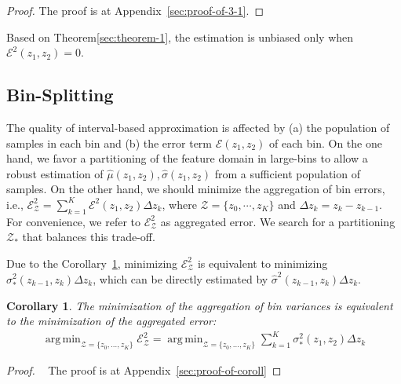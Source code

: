 \documentclass[twoside]{article}
\DeclareMathOperator*{\argmin}{arg\,min}
\newtheorem{corollary}{Corollary}[theorem]
\begin{document}
\begin{proof}
The proof is at Appendix~\ref{sec:proof-of-3-1}.
\end{proof}

\noindent

Based on Theorem\ref{sec:theorem-1}, the estimation is unbiased only
when \(\mathcal{E}^2(z_1, z_2) = 0\).

\subsection{Bin-Splitting}
\label{sec:bin-spliting}

The quality of interval-based approximation is affected by (a) the
population of samples in each bin and (b) the error term
\(\mathcal{E}(z_1, z_2)\) of each bin. On the one hand, we favor a
partitioning of the feature domain in large-bins to allow a robust
estimation of \(\hat{\mu}(z_1, z_2), \hat{\sigma}(z_1, z_2)\) from a
sufficient population of samples. On the other hand, we should
minimize the aggregation of bin errors, i.e.,
\( \mathcal{E}^2_{\mathcal{Z}} = \sum_{k=1}^K\mathcal{E}^2(z_1, z_2)
\Delta z_k\), where \(\mathcal{Z} = \{z_0, \cdots, z_K\}\) and
\(\Delta z_k = z_k - z_{k-1}\). For convenience, we refer to
\(\mathcal{E}^2_{\mathcal{Z}}\) as aggregated error. We search for a
partitioning \(\mathcal{Z}_*\) that balances this trade-off.

Due to the Corollary~\ref{sec:coroll}, minimizing
\( \mathcal{E}^2_{\mathcal{Z}} \) is equivalent to minimizing
\(\sigma_*^2(z_{k-1}, z_k)\Delta z_k\), which can be directly
estimated by \(\hat{\sigma}^2(z_{k-1}, z_k) \Delta z_k \).

\begin{corollary}
  \label{sec:coroll}
  The minimization of the aggregation of bin variances is equivalent
  to the minimization of the aggregated error:
  \begin{equation}
  \begin{gathered}
    \label{eq:2}
    \argmin_{ \mathcal{Z} = \{z_0, \ldots, z_K\}} \mathcal{E}^2_{\mathcal{Z}}  = \argmin_{ \mathcal{Z} = \{z_0, \ldots, z_K\}} \sum_{k=1}^K\sigma_*^2(z_1, z_2) \Delta z_k 
  \end{gathered}
  \end{equation}
\end{corollary}

\begin{proof}
~\label{sec:coroll-1}
  The proof is at Appendix~\ref{sec:proof-of-coroll}
  \end{proof}
\end{document}
